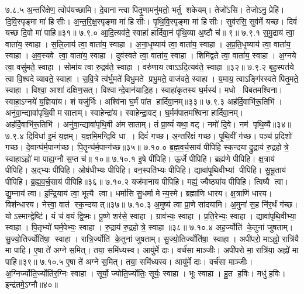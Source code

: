 ७.८.५
अ॒न्तरि॑क्षेण॒ त्वोप॑यच्छामि। दे॒वानान्त्वा पितृ॒णामनु॑मतो॒ भर्तु शकेयम्। तेजो॑ऽसि। तेजोऽनु॒ प्रेहि॑। दि॒वि॒स्पृङ्मा मा॑ हिसीः। अ॒न्त॒रि॒क्ष॒स्पृङ्मा मा॑ हिसीः। पृ॒थि॒वि॒स्पृङ्मा मा॑ हिसीः। सुव॑रसि॒ सुव॑र्मे यच्छ। दिवं॑ यच्छ दि॒वो मा॑ पाहि॥३१॥
७.९.०
आ॒दि॒त्यव॑ते॒ स्वाहा॑ हार्दिवा॒नं पृ॑थि॒व्या अ॒ष्टौ च॑॥ ९॥
\anuvakamend
७.९.१
स॒मु॒द्राय॑ त्वा॒ वाता॑य॒ स्वाहा। स॒लि॒लाय॑ त्वा॒ वाता॑य॒ स्वाहा। अ॒ना॒धृ॒ष्याय॑ त्वा॒ वाता॑य॒ स्वाहा। अ॒प्र॒ति॒धृ॒ष्याय॑ त्वा॒ वाता॑य॒ स्वाहा। अ॒व॒स्यवे त्वा॒ वाता॑य॒ स्वाहा। दुव॑स्वते त्वा॒ वाता॑य॒ स्वाहा। शिमि॑द्वते त्वा॒ वाता॑य॒ स्वाहा। अ॒ग्नये त्वा॒ वसु॑मते॒ स्वाहा। सोमा॑य त्वा रु॒द्रव॑ते॒ स्वाहा। वरु॑णाय त्वाऽऽदि॒त्यव॑ते॒ स्वाहा॥३२॥
७.९.२
बृह॒स्पत॑ये त्वा वि॒श्वदेव्यावते॒ स्वाहा। स॒वि॒त्रे त्व॑र्भु॒मते॑ विभु॒मते प्रभु॒मते॒ वाज॑वते॒ स्वाहा। य॒माय॒ त्वाऽङ्गि॑रस्वते पितृ॒मते॒ स्वाहा। विश्वा॒ आशा॑ दक्षिण॒सत्। विश्वान्दे॒वान॑याडि॒ह। स्वाहा॑कृतस्य घ॒र्मस्य॑। मधो पिबतमश्विना। स्वाहा॒ऽग्नये॑ य॒ज्ञिया॑य। शं यजु॑र्भिः। अश्वि॑ना घ॒र्मं पा॑त हार्दिवा॒नम्॥३३॥
७.९.३
अह॑र्दि॒वाभि॑रू॒तिभि॑। अनु॑वा॒न्द्यावा॑पृथि॒वी मसाताम्। स्वाहेन्द्रा॑य। स्वाहेन्द्रा॒वट्। घ॒र्मम॑पातमश्विना हार्दिवा॒नम्। अह॑र्दि॒वाभि॑रू॒तिभि॑। अनु॑वा॒न्द्यावा॑पृथि॒वी अ॑मसाताम्। तं प्रा॒व्यं॑ यथा॒ वट्। नमो॑ दि॒वे। नम॑ पृथि॒व्यै॥३४॥
७.९.४
दि॒विधा॑ इ॒मं य॒ज्ञम्। य॒ज्ञमि॒मन्दि॒वि धा। दिवं॑ गच्छ। अ॒न्तरि॑क्षं गच्छ। पृ॒थि॒वीं ग॑च्छ। पञ्च॑ प्र॒दिशो॑ गच्छ। दे॒वान्घ॑र्म॒पान्ग॑च्छ। पि॒तॄन्घ॑र्म॒पान्ग॑च्छ॥३५॥
७.१०.०
ब्र॒ह्म॒व॒र्च॒साय॑ पीपिहि स्क॒न्दयाद्रु॒द्राय॑ रु॒द्रहोत्रे॒ स्वाहाऽह्नो॑ मा पाह्य॒ग्नौ स॒प्त च॑॥ १०॥
\anuvakamend
७.१०.१
इ॒षे पी॑पिहि। ऊ॒र्जे पी॑पिहि। ब्रह्म॑णे पीपिहि। क्ष॒त्राय॑ पीपिहि। अ॒द्भ्यः पी॑पिहि। ओष॑धीभ्यः पीपिहि। वन॒स्पति॑भ्यः पीपिहि। द्यावा॑पृ॒थिवीभ्यां पीपिहि। सु॒भू॒ताय॑ पीपिहि। ब्र॒ह्म॒व॒र्च॒साय॑ पीपिहि॥३६॥
७.१०.२
यज॑मानाय पीपिहि। मह्यं॒ ज्यैष्ठ्या॑य पीपिहि। त्विष्यै त्वा। द्यु॒म्नाय॑ त्वा। इ॒न्द्रि॒याय॑ त्वा॒ भूत्यै त्वा। धर्मा॑सि सु॒धर्मा मेन्य॒स्मे। ब्रह्मा॑णि धारय। क्ष॒त्राणि॑ धारय। विश॑न्धारय। नेत्त्वा॒ वात॑ स्क॒न्दयात्॥३७॥
७.१०.३
अ॒मुष्य॑ त्वा प्रा॒णे सा॑दयामि। अ॒मुना॑ स॒ह नि॑र॒र्थं ग॑च्छ। योऽस्मान्द्वेष्टि॑। यं च॑ व॒यं द्वि॒ष्मः। पू॒ष्णे शर॑से॒ स्वाहा। ग्राव॑भ्यः॒ स्वाहा। प्र॒ति॒रेभ्यः॒ स्वाहा। द्यावा॑पृथि॒वीभ्या॒ स्वाहा। पि॒तृभ्यो॑ घर्म॒पेभ्यः॒ स्वाहा। रु॒द्राय॑ रु॒द्रहोत्रे॒ स्वाहा॥३८॥
७.१०.४
अह॒र्ज्योति॑ के॒तुना॑ जुषताम्। सु॒ज्यो॒तिर्ज्योति॑षा॒ स्वाहा। रात्रि॒र्ज्योति॑ के॒तुना॑ जुषताम्। सु॒ज्यो॒तिर्ज्योति॑षा॒ स्वाहा। अपी॑परो॒ माऽह्नो॒ रात्रि॑यै मा पाहि। ए॒षा ते॑ अग्ने स॒मित्। तया॒ समि॑ध्यस्व। आयु॑र्मे दाः। वर्च॑सा माञ्जीः। अपी॑परो मा॒ रात्रि॑या॒ अह्नो॑ मा पाहि॥३९॥
७.१०.५
ए॒षा ते॑ अग्ने स॒मित्। तया॒ समि॑ध्यस्व। आयु॑र्मे दाः। वर्च॑सा माञ्जीः। अ॒ग्निर्ज्योति॒र्ज्योति॑र॒ग्निः स्वाहा। सूर्यो॒ ज्योति॒र्ज्योतिः॒ सूर्यः॒ स्वाहा। भूः स्वाहा। हु॒त ह॒विः। मधु॑ ह॒विः। इन्द्र॑तमे॒ऽग्नौ॥४०॥
